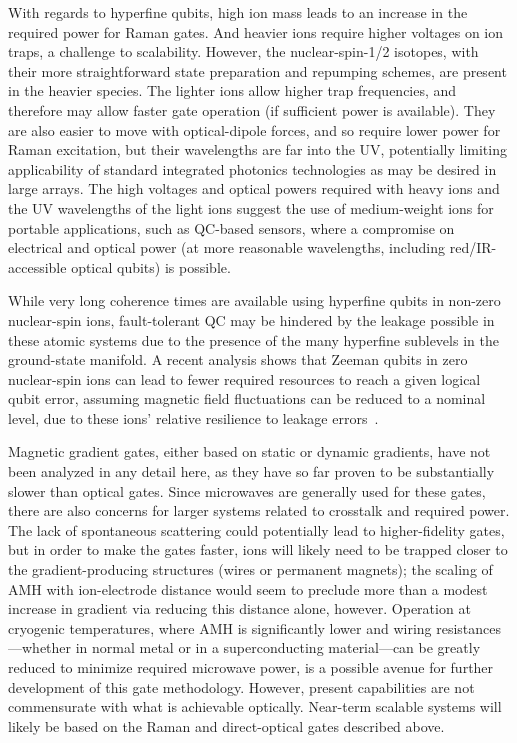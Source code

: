 \documentclass[%
reprint,
 amsmath,amssymb,
]{revtex4-1}
\begin{document}
With regards to hyperfine qubits, high ion mass leads to an increase in the required power for Raman gates.  And heavier ions require higher voltages on ion traps, a challenge to scalability.  However, the nuclear-spin-1/2 isotopes, with their more straightforward state preparation and repumping schemes, are present in the heavier species.  The lighter ions allow higher trap frequencies, and therefore may allow faster gate operation (if sufficient power is available). They are also easier to move with optical-dipole forces, and so require lower power for Raman excitation, but their wavelengths are far into the UV, potentially limiting applicability of standard integrated photonics technologies as may be desired in large arrays.  The high voltages and optical powers required with heavy ions and the UV wavelengths of the light ions suggest the use of medium-weight ions for portable applications, such as QC-based sensors, where a compromise on electrical and optical power (at more reasonable wavelengths, including red/IR-accessible optical qubits) is possible.

While very long coherence times are available using hyperfine qubits in non-zero nuclear-spin ions, fault-tolerant QC may be hindered by the leakage possible in these atomic systems due to the presence of the many hyperfine sublevels in the ground-state manifold.  A recent analysis shows that Zeeman qubits in zero nuclear-spin ions can lead to fewer required resources to reach a given logical qubit error, assuming magnetic field fluctuations can be reduced to a nominal level, due to these ions' relative resilience to leakage errors~\cite{PhysRevA.97.052301_2018}.

Magnetic gradient gates, either based on static or dynamic gradients, have not been analyzed in any detail here, as they have so far proven to be substantially slower than optical gates. Since microwaves are generally used for these gates, there are also concerns for larger systems related to crosstalk and required power. The lack of spontaneous scattering could potentially lead to higher-fidelity gates, but in order to make the gates faster, ions will likely need to be trapped closer to the gradient-producing structures (wires or permanent magnets); the scaling of AMH with ion-electrode distance would seem to preclude more than a modest increase in gradient via reducing this distance alone, however.  Operation at cryogenic temperatures, where AMH is significantly lower and wiring resistances---whether in normal metal or in a superconducting material---can be greatly reduced to minimize required microwave power, is a possible avenue for further development of this gate methodology. However, present capabilities are not commensurate with what is achievable optically.  Near-term scalable systems will likely be based on the Raman and direct-optical gates described above.
\end{document}
